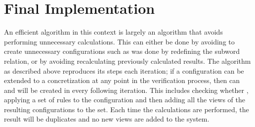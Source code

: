

\newpage
\section{Final Implementation}
\label{improved2}
An efficient algorithm in this context is largely an algorithm that avoids performing unnecessary calculations. This can either be done by avoiding to create unnecessary configurations such as was done by redefining the subword relation, or by avoiding recalculating previously calculated results. The algorithm as described above reproduces its steps each iteration; if a configuration  can be extended to a concretization  at any point in the verification process, then  can and will be created in every following iteration. This includes checking whether , applying a set of rules to the configuration and then adding all the views of the resulting configurations to the set. Each time the calculations are performed, the result will be duplicates and no new views are added to the system.

